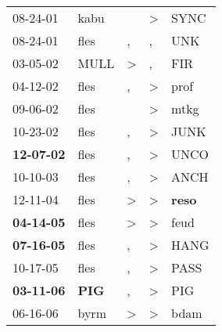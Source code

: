 \begin{supertabular}{p{0.07\textwidth}p{0.06\textwidth}p{0.02\textwidth}p{0.02\textwidth}p{0.06\textwidth}}
          08-24-01\textsuperscript{} &          kabu\textsuperscript{} &               &     \textgreater &           SYNC\textsuperscript{} \\
          08-24-01\textsuperscript{} &          fles\textsuperscript{} &             , &                , &            UNK\textsuperscript{} \\
          03-05-02\textsuperscript{} &          MULL\textsuperscript{} &  \textgreater &                , &            FIR\textsuperscript{} \\
          04-12-02\textsuperscript{} &          fles\textsuperscript{} &             , &     \textgreater &           prof\textsuperscript{} \\
          09-06-02\textsuperscript{} &          fles\textsuperscript{} &               &     \textgreater &           mtkg\textsuperscript{} \\
          10-23-02\textsuperscript{} &          fles\textsuperscript{} &             , &     \textgreater &           JUNK\textsuperscript{} \\
 \textbf{12-07-02\textsuperscript{}} &          fles\textsuperscript{} &             , &     \textgreater &           UNCO\textsuperscript{} \\
          10-10-03\textsuperscript{} &          fles\textsuperscript{} &             , &     \textgreater &           ANCH\textsuperscript{} \\
          12-11-04\textsuperscript{} &          fles\textsuperscript{} &  \textgreater &     \textgreater &  \textbf{reso\textsuperscript{}} \\
 \textbf{04-14-05\textsuperscript{}} &          fles\textsuperscript{} &  \textgreater &     \textgreater &           feud\textsuperscript{} \\
 \textbf{07-16-05\textsuperscript{}} &          fles\textsuperscript{} &             , &     \textgreater &           HANG\textsuperscript{} \\
          10-17-05\textsuperscript{} &          fles\textsuperscript{} &             , &     \textgreater &           PASS\textsuperscript{} \\
 \textbf{03-11-06\textsuperscript{}} &  \textbf{PIG\textsuperscript{}} &             , &     \textgreater &            PIG\textsuperscript{} \\
          06-16-06\textsuperscript{} &          byrm\textsuperscript{} &  \textgreater &     \textgreater &           bdam\textsuperscript{} \\

\end{supertabular}
